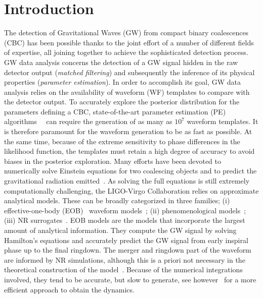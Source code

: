 \section{Introduction}
The detection of Gravitational Waves (GW) from compact binary coalescences (CBC) has been possible thanks to the joint effort of a number of different fields of expertise, all joining together to achieve the sophisticated detection process. GW data analysis concerns the detection of a GW signal hidden in the raw detector output (\textit{matched filtering}) and subsequently the inference of its physical properties (\textit{parameter estimation}). In order to accomplish its goal, GW data analysis relies on the availability of waveform (WF) templates to compare with the detector output.
To accurately explore the posterior distribution for the parameters defining a CBC, state-of-the-art parameter estimation (PE) algorithms~\cite{Aasi:2013jjl}~\cite{Veitch2014wba} can require the generation of as many as $10^7$ waveform templates. It is therefore paramount for the waveform generation to be as fast as possible. At the same time, because of the extreme sensitivity to phase differences in the likelihood  function, 
the templates must retain a high degree of accuracy to avoid biases in the posterior exploration.
Many efforts have been devoted to numerically solve Einstein equations for two coalescing objects and 
to predict the gravitational radiation emitted~\cite{Boyle:2019kee,Healy:2019jyf,Healy:2020vre}.
As solving the full equations is still extremely computationally challenging, the LIGO-Virgo Collaboration 
relies on approximate analytical models. 
These can be broadly categorized in  three families; (i) effective-one-body (EOB)~\cite{Buonanno:2000ef} 
waveform models~\cite{Damour:2009kr,Nagar:2020pcj,Chiaramello:2020ehz,Ossokine:2020kjp}; (ii) phenomenological 
models~\cite{Khan:2015jqa,Pratten:2020ceb,Estelles:2020osj}; (iii) NR surrogates~\cite{Varma:2018mmi,Williams:2019vub,Varma:2019csw,Rifat:2019ltp,Khan:2020fso}.
%
EOB models are the models that incorporate the largest amount of analytical information.
They compute the GW signal by solving Hamilton's equations  and accurately predict the 
GW signal from early inspiral phase up to the final ringdown. The merger and ringdown part
of the waveform are informed by NR simulations, although this is a priori not necessary
in the theoretical construction of the model~\cite{Buonanno:2000ef,Damour:2007xr,Damour:2009wj}.
Because of the numerical integrations involved, they tend to be accurate, but slow to generate, 
see however~\cite{Nagar:2018gnk} for a more efficient approach to obtain the dynamics.


